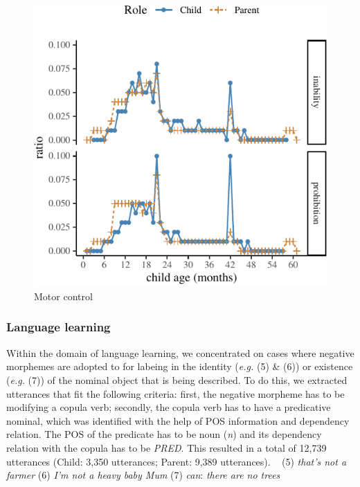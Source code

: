 \documentclass[10pt, letterpaper]{article}
\newenvironment{CodeChunk}{}{}
\begin{document}
\begin{CodeChunk}
\begin{figure}[H]

{\centering \includegraphics{figs/motor_control-1} 

}

\caption[Motor control]{Motor control}\label{fig:motor_control}
\end{figure}
\end{CodeChunk}

\hypertarget{language-learning}{%
\subsubsection{Language learning}\label{language-learning}}

Within the domain of language learning, we concentrated on cases where
negative morphemes are adopted to for labeing in the identity
(\emph{e.g.} (5) \& (6)) or existence (\emph{e.g.} (7)) of the nominal
object that is being described. To do this, we extracted utterances that
fit the following criteria: first, the negative morpheme has to be
modifying a copula verb; secondly, the copula verb has to have a
predicative nominal, which was identified with the help of POS
information and dependency relation. The POS of the predicate has to be
noun (\emph{n}) and its dependency relation with the copula has to be
\emph{PRED}. This resulted in a total of 12,739 utterances (Child: 3,350
utterances; Parent: 9,389 utterances). ~ (5) \emph{that's not a farmer}
(6) \emph{I'm not a heavy baby Mum} (7) \emph{can}: \emph{there are no
trees} ~
\end{document}
